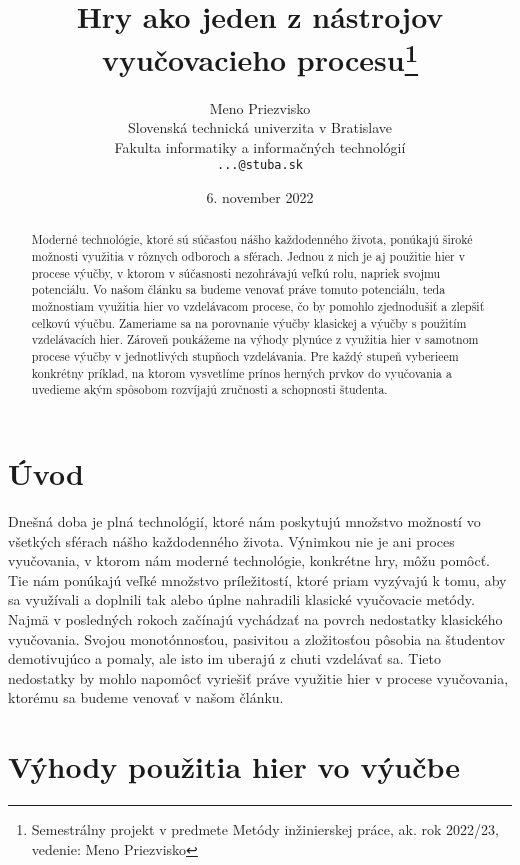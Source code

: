 \documentclass[10pt,twoside,slovak,a4paper]{article}
\title{Hry ako jeden z nástrojov vyučovacieho procesu\thanks{Semestrálny projekt v predmete Metódy inžinierskej práce, ak. rok 2022/23, vedenie: Meno Priezvisko}}
\author{Meno Priezvisko\\[2pt]
	{\small Slovenská technická univerzita v Bratislave}\\
	{\small Fakulta informatiky a informačných technológií}\\
	{\small \texttt{...@stuba.sk}}
	}
\date{\small 6. november 2022}
\begin{document}
\maketitle

\begin{abstract}

Moderné technológie, ktoré sú súčasťou nášho každodenného života, ponúkajú široké možnosti využitia v rôznych odboroch a sférach. Jednou z nich je aj použitie hier v procese výučby, v ktorom v súčasnosti nezohrávajú veľkú rolu, napriek svojmu potenciálu. Vo našom článku sa budeme venovať práve tomuto potenciálu, teda možnostiam využitia hier vo vzdelávacom procese, čo by pomohlo zjednodušiť a zlepšiť celkovú výučbu. Zameriame sa na porovnanie výučby klasickej a výučby s použitím vzdelávacích hier. Zároveň poukážeme na výhody plynúce z využitia hier v samotnom procese výučby v jednotlivých stupňoch vzdelávania. Pre každý stupeň vyberieem konkrétny príklad, na ktorom vysvetlíme prínos herných prvkov do vyučovania a uvedieme akým spôsobom rozvíjajú zručnosti a schopnosti študenta.

\end{abstract}



\section{Úvod}

Dnešná doba je plná technológií, ktoré nám poskytujú množstvo možností vo všetkých sférach nášho každodenného života. Výnimkou nie je ani proces vyučovania, v ktorom nám moderné technológie, konkrétne hry\cite{Zea2009-eh}, môžu pomôcť. Tie nám ponúkajú veľké množstvo príležitostí, ktoré priam vyzývajú k tomu, aby sa využívali a doplnili tak alebo úplne nahradili klasické vyučovacie metódy. Najmä v posledných rokoch začínajú vychádzať na povrch nedostatky klasického vyučovania. Svojou monotónnosťou, pasivitou a zložitosťou pôsobia na študentov demotivujúco a pomaly, ale isto im uberajú z chuti vzdelávať sa. Tieto nedostatky by mohlo napomôcť vyriešiť práve využitie hier v procese vyučovania, ktorému sa budeme venovať v našom článku. 

\section{Výhody použitia hier vo výučbe}
\end{document}
